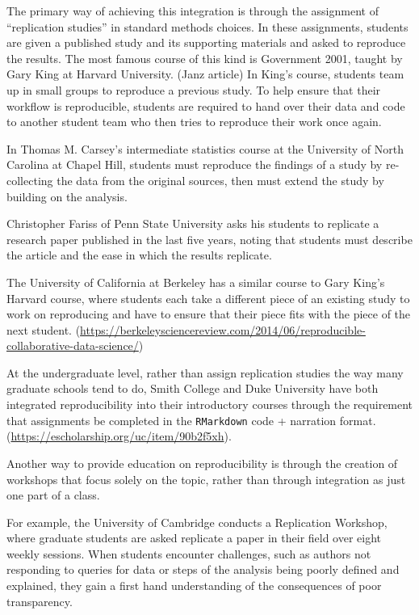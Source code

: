 \documentclass[12pt,twoside]{reedthesis}
\begin{document}
The primary way of achieving this integration is through the assignment
of ``replication studies'' in standard methods choices. In these
assignments, students are given a published study and its supporting
materials and asked to reproduce the results. The most famous course of
this kind is Government 2001, taught by Gary King at Harvard University.
(Janz article) In King's course, students team up in small groups to
reproduce a previous study. To help ensure that their workflow is
reproducible, students are required to hand over their data and code to
another student team who then tries to reproduce their work once again.

In Thomas M. Carsey's intermediate statistics course at the University
of North Carolina at Chapel Hill, students must reproduce the findings
of a study by re-collecting the data from the original sources, then
must extend the study by building on the analysis.

Christopher Fariss of Penn State University asks his students to
replicate a research paper published in the last five years, noting that
students must describe the article and the ease in which the results
replicate.

The University of California at Berkeley has a similar course to Gary
King's Harvard course, where students each take a different piece of an
existing study to work on reproducing and have to ensure that their
piece fits with the piece of the next student.
(\url{https://berkeleysciencereview.com/2014/06/reproducible-collaborative-data-science/})

At the undergraduate level, rather than assign replication studies the
way many graduate schools tend to do, Smith College and Duke University
have both integrated reproducibility into their introductory courses
through the requirement that assignments be completed in the
\texttt{RMarkdown} code + narration format.
(\url{https://escholarship.org/uc/item/90b2f5xh}).

Another way to provide education on reproducibility is through the
creation of workshops that focus solely on the topic, rather than
through integration as just one part of a class.

For example, the University of Cambridge conducts a Replication
Workshop, where graduate students are asked replicate a paper in their
field over eight weekly sessions. When students encounter challenges,
such as authors not responding to queries for data or steps of the
analysis being poorly defined and explained, they gain a first hand
understanding of the consequences of poor transparency.
\end{document}
